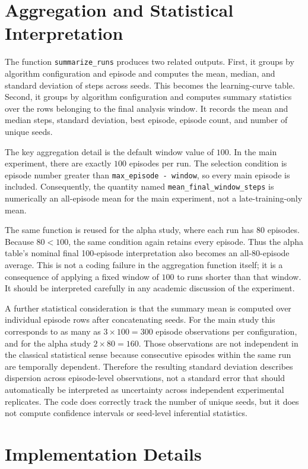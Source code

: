 \documentclass[11pt,a4paper]{article}
\begin{document}
\section{Aggregation and Statistical Interpretation}
The function \texttt{summarize\_runs} produces two related outputs. First, it groups by algorithm configuration and episode and computes the mean, median, and standard deviation of steps across seeds. This becomes the learning-curve table. Second, it groups by algorithm configuration and computes summary statistics over the rows belonging to the final analysis window. It records the mean and median steps, standard deviation, best episode, episode count, and number of unique seeds.

The key aggregation detail is the default window value of $100$. In the main experiment, there are exactly $100$ episodes per run. The selection condition is episode number greater than \texttt{max\_episode - window}, so every main episode is included. Consequently, the quantity named \texttt{mean\_final\_window\_steps} is numerically an all-episode mean for the main experiment, not a late-training-only mean.

The same function is reused for the alpha study, where each run has $80$ episodes. Because $80<100$, the same condition again retains every episode. Thus the alpha table's nominal final 100-episode interpretation also becomes an all-80-episode average. This is not a coding failure in the aggregation function itself; it is a consequence of applying a fixed window of $100$ to runs shorter than that window. It should be interpreted carefully in any academic discussion of the experiment.

A further statistical consideration is that the summary mean is computed over individual episode rows after concatenating seeds. For the main study this corresponds to as many as $3\times100=300$ episode observations per configuration, and for the alpha study $2\times80=160$. Those observations are not independent in the classical statistical sense because consecutive episodes within the same run are temporally dependent. Therefore the resulting standard deviation describes dispersion across episode-level observations, not a standard error that should automatically be interpreted as uncertainty across independent experimental replicates. The code does correctly track the number of unique seeds, but it does not compute confidence intervals or seed-level inferential statistics.

\section{Implementation Details}
\end{document}
